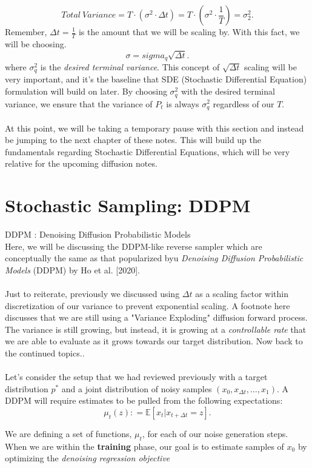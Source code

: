 \documentclass[10pt, oneside]{report}
\newcommand{\E}{\mathbb{E}}
\begin{document}
\[
Total\ Variance = T \cdot (\sigma^2 \cdot \Delta t) = T \cdot (\sigma^2 \cdot \frac{1}{T}) = \sigma^2_2
.\] 
Remember, $\Delta t =  \frac{1}{T}$ is the amount that we will be scaling by.  With this fact, we will be choosing. \[
    \sigma = sigma_q\sqrt{\Delta t}
.\] where $\sigma^2_q$ is the \textit{desired terminal variance}.  This concept of $\sqrt{\Delta t}$ scaling will be very important, and it's the baseline that SDE (Stochastic Differential Equation) formulation will build on later. By choosing $\sigma^2_q$ with the desired terminal variance, we ensure that the variance of $P_t$ is always $\sigma^2_q$ regardless of our $T$.
\\
\\
At this point, we will be taking a temporary pause with this section and instead be jumping to the next chapter of these notes.  This will build up the fundamentals regarding Stochastic Differential Equations, which will be very relative for the upcoming diffusion notes. 

\section{Stochastic Sampling: DDPM}
DDPM : Denoising Diffusion Probabilistic Models\\

Here, we will be discussing the DDPM-like reverse sampler which are conceptually the same as that popularized byu \textit{Denoising Diffusion Probabilistic Models} (DDPM) by Ho et al. [2020].\\
\\
Just to reiterate, previously we discussed using $\Delta t$ as a scaling factor within discretization of our variance to prevent exponential scaling.  A footnote here discusses that we are still using a "Variance Exploding" diffusion forward process.  The variance is still growing, but instead, it is growing at a \textit{controllable rate} that we are able to evaluate as it grows towards our target distribution. Now back to the continued topics..\\
\\
Let's consider the setup that we had reviewed previously with a target distribution $p^*$ and a joint distribution of noisy samples $(x_0, x_{\Delta t}, \ldots, x_1)$.  A DDPM will require estimates to be pulled from the following expectations:
\[
    \mu_t (z) : = \E[x_t | x_{t+\Delta t} = z]
.\] 

We are defining a set of functions, $\mu_t$, for each of our noise generation steps.  When we are within the \textbf{training} phase, our goal is to estimate samples of $x_0$ by optimizing the \textit{denoising regression objective}
\end{document}
